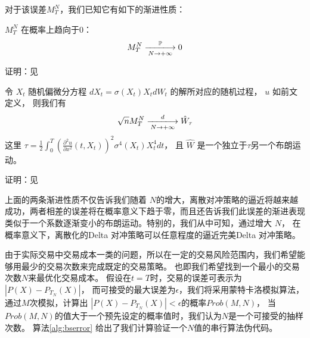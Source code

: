 对于该误差$M_T^N$，我们已知它有如下的渐进性质：
\begin{theorem}
$M_T^N$ 在概率上趋向于0：
\begin{equation}
M_T^N\xlongrightarrow[N\rightarrow +\infty]{\mathbb{P}}0
\end{equation}
\end{theorem}
证明：见\cite{ContinuousMartingaleAndBrownianMotion}

\begin{theorem}
令 $X_t$ 随机偏微分方程 $dX_t=\sigma(X_t)X_tdW_t$ 的解所对应的随机过程， $u$ 如前文定义， 则我们有 
\begin{equation}
\sqrt{n}M_T^N\xlongrightarrow[N\rightarrow +\infty]{d} \hat{W}_\tau
\end{equation}
这里 $\tau=\frac{1}{2}\int_0^T(\frac{\partial^2 u}{\partial x^2}(t,X_t))^2\sigma^4(X_t)X_t^4dt$， 且 $\hat{W}$ 是一个独立于$\tau$另一个布朗运动。
\end{theorem}
证明：见\cite{rootzen1980}

上面的两条渐进性质不仅告诉我们随着 $N$的增大，离散对冲策略的逼近将越来越成功，两者相差的误差将在概率意义下趋于零，而且还告诉我们此误差的渐进表现
类似于一个系数逐渐变小的布朗运动。特别的，我们从中可知，通过增大 $N$， 在概率意义下，离散化的Delta 对冲策略可以任意程度的逼近完美Delta 对冲策略。

由于实际交易中交易成本一类的问题，所以在一定的交易风险范围内，我们希望能够用最少的交易次数来完成既定的交易策略。
也即我们希望找到一个最小的交易次数$N$来最优化交易成本。
假设在$t=T$时，交易的误差可表示为$|P(X) - P_{T_N}(X)|$， 而可接受的最大误差为$\epsilon$，我们将采用蒙特卡洛模拟算法，通过$M$次模拟，计算出
$|P(X) - P_{T_N}(X)| < \epsilon$的概率$Prob(M,N)$， 当$Prob(M,N)$的值大于一个预先设定的概率值时，我们认为$N$是一个可接受的抽样次数。
算法\ref{alg:bserror} 给出了我们计算验证一个$N$值的串行算法伪代码。

